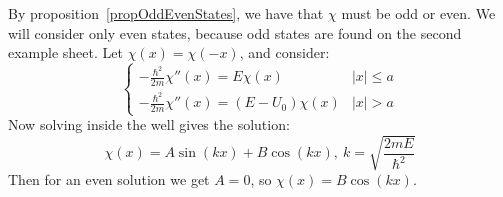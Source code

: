 \documentclass[../Main.tex]{subfiles}
\begin{document}
By proposition~\ref{propOddEvenStates}, we have that $\chi$ must be odd or even. We will consider only even states, because odd states are found on the second example sheet. Let $\chi(x) = \chi(-x)$, and consider:
\begin{equation*}
    \begin{cases}
        -\frac{\hbar^2}{2m}\chi''(x) = E\chi(x) & |x| \leq a \\
        -\frac{\hbar^2}{2m}\chi''(x) = (E - U_0)\chi(x) & |x| > a
    \end{cases}
\end{equation*}
Now solving inside the well gives the solution:
\begin{equation*}
    \chi(x) = A\sin(kx) + B\cos(kx),~k = \sqrt{\frac{2mE}{\hbar^2}}
\end{equation*}
Then for an even solution we get $A = 0$, so $\chi(x) = B\cos(kx)$.
\end{document}
